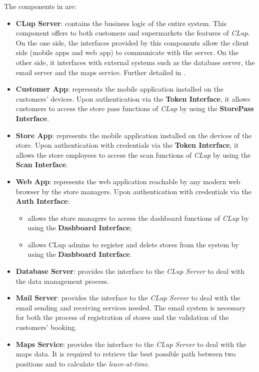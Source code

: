 The components in  are:
\begin{itemize}
	\item \textbf{CLup Server}: contains the business logic of the entire system. This component offers to both customers and supermarkets the features of \textit{CLup}. On the one side, the interfaces provided by this components allow the client side (mobile apps and web app) to communicate with the server. On the other side, it interfaces with external systems such as the database server, the email server and the maps service. Further detailed in .
	
	\item \textbf{Customer App}: represents the mobile application installed on the customers' devices. Upon authentication via the \textbf{Token Interface}, it allows customers to access the store pass functions of \textit{CLup} by using the \textbf{StorePass Interface}.
	
	\item \textbf{Store App}: represents the mobile application	installed on the devices of the store. Upon authentication with credentials via the \textbf{Token Interface}, it allows the store employees to access the scan functions of \textit{CLup} by using the \textbf{Scan Interface}.
	
	\item \textbf{Web App}: represents the web application reachable by any modern web browser by the store managers. Upon authentication with credentials via the \textbf{Auth Interface}:
	\begin{itemize}
		\item allows the store managers to access the dashboard functions of \textit{CLup} by using the \textbf{Dashboard Interface};
		\item allows CLup admins to register and delete stores from the system by using the \textbf{Dashboard Interface}.
	\end{itemize}
	
	\item \textbf{Database Server}:	provides the interface to the \textit{CLup Server} to deal with the data management process. 
	
	\item \textbf{Mail Server}: provides the interface to the \textit{CLup Server} to deal with the email sending and receiving services needed. The email system is necessary for both the process of registration of stores and the validation of the customers' booking.
	
	\item \textbf{Maps Service}: provides the interface to the \textit{CLup Server} to deal with the maps data. It is required to retrieve the best possible path between two positions and to calculate the \textit{leave-at-time}.
\end{itemize}


